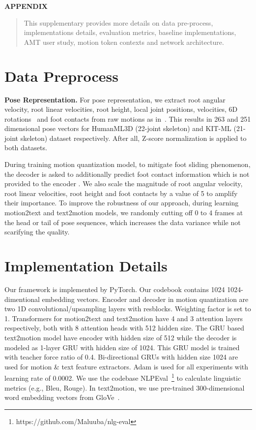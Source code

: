 \documentclass[runningheads]{llncs}
\newcommand{\beforesection}{\vspace{-2mm}}
\newcommand{\aftersection}{\vspace{-2mm}}
\newcommand{\beforesubsection}{\vspace{-2mm}}
\newcommand{\aftersubsection}{\vspace{-2mm}}
\begin{document}



\clearpage


\appendix
\noindent\textbf{\large APPENDIX}
\begin{abstract}
This supplementary provides more details on data pre-process, implementations details, evaluation metrics, baseline implementations, AMT user study, motion token contexts and network architecture.
\end{abstract}
\beforesection
\section{Data Preprocess}
\aftersection
\noindent\textbf{Pose Representation.} For pose representation, we extract root angular velocity, root linear velocities, root height, local joint positions, velocities, 6D rotations~\cite{zhou2019continuity} and foot contacts from raw motions as in~\cite{holden2017phase}. This results in 263 and 251 dimensional pose vectors for HumanML3D (22-joint skeleton) and KIT-ML (21-joint skeleton) dataset respectively. After all, Z-score normalization is applied to both datasets.

During training motion quantization model, to mitigate foot sliding phenomenon, the decoder  is asked to additionally predict foot contact information which is not provided to the encoder . We also scale the magnitude of root angular velocity, root linear velocities, root height and foot contacts by a value of 5 to amplify their importance. To improve the robustness of our approach, during learning motion2text and text2motion models, we randomly cutting off 0 to 4 frames at the head or tail of pose sequences, which increases the data variance while not scarifying the quality.

\beforesubsection
\section{Implementation Details}
\aftersubsection
Our framework is implemented by PyTorch. Our codebook  contains 1024 1024-dimentional embedding vectors. 
Encoder and decoder in motion quantization are two 1D convolutional/upsampling layers with resblocks. Weighting factor  is set to 1. Transformers for motion2text and text2motion have 4 and 3 attention layers respectively, both with 8 attention heads with 512 hidden size. The GRU based text2motion model have encoder with hidden size of 512 while the decoder is modeled as 1-layer GRU with hidden size of 1024. This GRU model is trained with teacher force ratio of 0.4. Bi-directional GRUs with hidden size 1024 are used for motion \& text feature extractors. Adam is used for all experiments with learning rate of 0.0002. We use the codebase NLPEval~\footnote{https://github.com/Maluuba/nlg-eval} to calculate linguistic metrics (e.g., Bleu, Rouge). In text2motion, we use pre-trained 300-dimensional word embedding vectors from GloVe~\cite{pennington2014glove}. 
\end{document}
